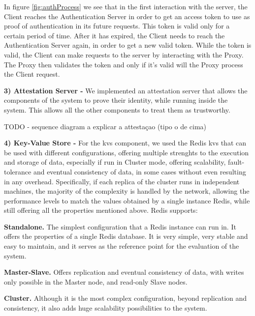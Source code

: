 In figure \ref{fig:authProcess} we see that in the first interaction with the server, the Client reaches the Authentication Server in order to get an access token to use as proof of authentication in its future requests. This token is valid only for a certain period of time. After it has expired, the Client needs to reach the Authentication Server again, in order to get a new valid token. While the token is valid, the Client can make requests to the server by interacting with the Proxy. The Proxy then validates the token and only if it's valid will the Proxy process the Client request.

\vspace{5mm} 

\textbf{3) Attestation Server -}
We implemented an attestation server that allows the components of the system to prove their identity, while running inside the system. This allows all the other components to treat them as trustworthy.

TODO - sequence diagram a explicar a attestaçao (tipo o de cima)


\vspace{5mm} 

\textbf{4) Key-Value Store -}
For the \gls{kvs} component, we used the Redis \gls{kvs} that can be used with different configurations, offering multiple strenghts to the execution and storage of data, especially if run in Cluster mode, offering scalability, fault-tolerance and eventual consistency of data, in some cases without even resulting in any overhead. 
Specifically, if each replica of the cluster runs in independent machines, the majority of the complexity is handled by the network, allowing the performance levels to match the values obtained by a single instance Redis, while still offering all the properties mentioned above. 
Redis supports: 

\textbf{Standalone.} The simplest configuration that a Redis instance can run in. It offers the properties of a single Redis database. It is very simple, very stable and easy to maintain, and it serves as the reference point for the evaluation of the system.

\textbf{Master-Slave.} Offers replication and eventual consistency of data, with writes only possible in the Master node, and read-only Slave nodes.

\textbf{Cluster.} Although it is the most complex configuration, beyond replication and consistency, it also adds huge scalability possibilities to the system.

